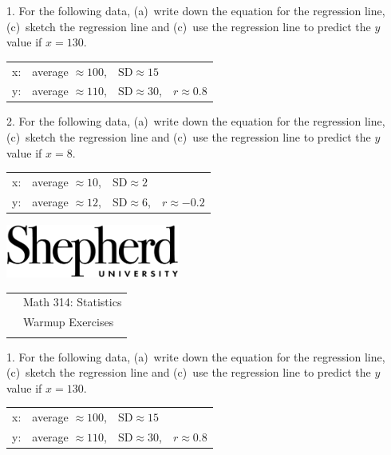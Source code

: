 \documentclass[10pt]{article}
\begin{document}
{\setlength{\baselineskip}{1.05\baselineskip}

1. For the following data, (a)~write down the equation for the regression line, 
(c)~sketch the regression line and (c)~use the regression line to predict the $y$ value
if $x=130$.\vspace{-8pt}
\begin{center}
\begin{tabular}{llll}
x: & average $\approx 100$, & $\mbox{SD}\approx 15$\\
y: & average $\approx 110$, & $\mbox{SD}\approx 30$,  & $r\approx 0.8$\\
\end{tabular}
\end{center}
\vspace{1.25in}

2. For the following data, (a)~write down the equation for the regression line, 
(c)~sketch the regression line and (c)~use the regression line to predict the $y$ value
if $x=8$.\vspace{-8pt}
\begin{center}
\begin{tabular}{llll}
x: & average $\approx 10$, & $\mbox{SD}\approx 2$\\
y: & average $\approx 12$, & $\mbox{SD}\approx 6$,  & $r\approx -0.2$\\
\end{tabular}
\end{center}
\vfill\vfill

\href{http://www.shepherd.edu}{\includegraphics[height=1.75cm]{logo-high-res.eps}}
\vspace{-1.69cm}

{\small
\begin{tabular}{cl}
\hspace{5in} & Math 314:  Statistics\\
                & Warmup Exercises\\
                & %
\end{tabular}
}
\medskip

1. For the following data, (a)~write down the equation for the regression line, 
(c)~sketch the regression line and (c)~use the regression line to predict the $y$ value
if $x=130$.\vspace{-8pt}
\begin{center}
\begin{tabular}{llll}
x: & average $\approx 100$, & $\mbox{SD}\approx 15$\\
y: & average $\approx 110$, & $\mbox{SD}\approx 30$,  & $r\approx 0.8$\\
\end{tabular}
\end{center}
\vspace{1.25in}

}
\end{document}
